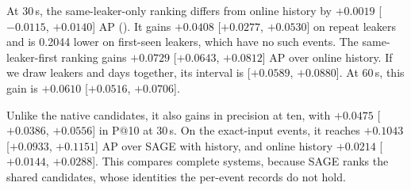 At 30\,s, the same-leaker-only ranking differs from online history by $+0.0019$ [$-0.0115$, $+0.0140$] AP ().
It gains $+0.0408$ [$+0.0277$, $+0.0530$] on repeat leakers and is 0.2044 lower on first-seen leakers, which have no such events.
The same-leaker-first ranking gains $+0.0729$ [$+0.0643$, $+0.0812$] AP over online history.
If we draw leakers and days together, its interval is [$+0.0589$, $+0.0880$].
At 60\,s, this gain is $+0.0610$ [$+0.0516$, $+0.0706$].

Unlike the native candidates, it also gains in precision at ten, with $+0.0475$ [$+0.0386$, $+0.0556$] in P@10 at 30\,s.
On the exact-input events, it reaches $+0.1043$ [$+0.0933$, $+0.1151$] AP over SAGE with history, and online history $+0.0214$ [$+0.0144$, $+0.0288$].
This compares complete systems, because SAGE ranks the shared candidates, whose identities the per-event records do not hold.

